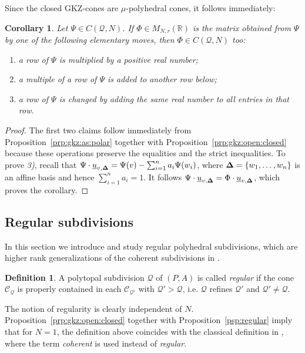 \documentclass[12pt, a4article]{amsart}   	%
\numberwithin{equation}{section}
\theoremstyle{plain}
\newtheorem{corollary}[theorem]{Corollary}
\theoremstyle{definition}
\newtheorem{definition}[theorem]{Definition}
\newcommand{\bfDelta}{{\bf \Delta}}
\newcommand{\mcC}{{\mathcal C}}
\newcommand{\mcQ}{{\mathcal Q}}
\newcommand{\uu}{{\underline u}}
\begin{document}
Since the closed GKZ-cones are $\mu$-polyhedral cones, it follows immediately:

\begin{corollary}\label{coro:elementary:moves}
Let $\Psi\in {C(\mcQ,N)}$. If $\Phi\in M_{N,r}(\mathbb R)$ is the matrix obtained from 
$\Psi$ by one of the following elementary moves, then $\Phi\in {C(\mcQ,N)}$ too:
\begin{enumerate}
\item a row of $\Psi$ is multiplied by a positive real number;
\item a multiple of a row of $\Psi$  is added to another row below;
\item a row of $\Psi$ is changed by adding the same real number to all entries in that row.
\end{enumerate}
\end{corollary}

\begin{proof}
The first two claims follow immediately from Proposition~\ref{prp:gkz:as:polar} together with 
Proposition~\ref{prp:gkz:open:closed} because these operations preserve the equalities and the strict inequalities. To prove {\it 3)}, recall that  $\Psi\cdot\uu_{v,\bfDelta} = \Psi(v) - \sum_{i=1}^n a_i\Psi(w_i)$, where $\bfDelta=\{w_1,\ldots,w_n\}$ is an affine basis and hence $\sum_{i=1}^n a_i=1$. It follows $\Psi\cdot\uu_{v,\bfDelta} =\Phi\cdot\uu_{v,\bfDelta} $, which proves the corollary.
\end{proof}


\subsection{Regular subdivisions}

In this section we introduce and study regular polyhedral subdivisions, which are higher rank generalizations of the coherent subdivisions in \cite{GKZ}.

\begin{definition}\label{def:regular:condition:cone}
A polytopal subdivision $\mcQ$ of $(P,A)$ is called \emph{regular} if the cone $\mcC_\mcQ$ is properly contained in each $\mcC_{\mcQ'}$ with $\mcQ'>\mcQ$, i.e. $\mcQ$ refines $\mcQ'$ and $\mcQ'\not=\mcQ$.%
\end{definition}

The notion of regularity is clearly independent of $N$. Proposition~\ref{prp:gkz:open:closed} together with Proposition~\ref{psp:regular} imply that for $N=1$, the definition above coincides with the classical definition in \cite[Chapter 7, Definition 2.3]{GKZ}, where the term \emph{coherent} is used instead of \emph{regular}.
\end{document}
